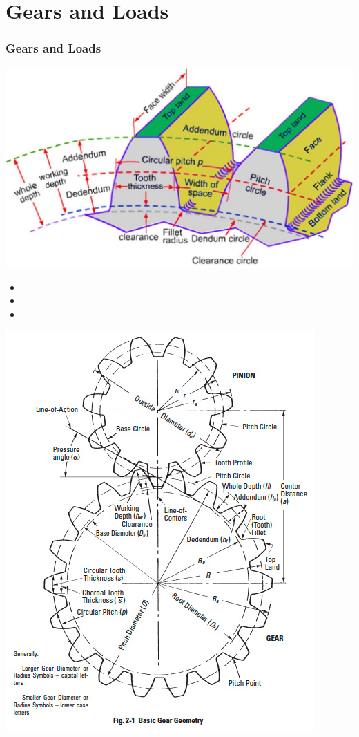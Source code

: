 \documentclass[fleqn]{beamer} %
\newcommand{\sectiontitleIII}{Gears and Loads}
\begin{document}
\section{\sectiontitleIII}	

	\begin{frame}[label=sectionIII] \small
		\frametitle{\sectiontitleIII}
	 		
			\begin{multicols}{2}
	 		\includegraphics[scale=0.20]{images/Gearnomenclature.png}
	        \begin{itemize}
	            \item 
	            \item 
	            \item 
	        \end{itemize}

	        \includegraphics[scale=0.3]{images/law_of_gearing.png}
	        \end{multicols}

	    
	        
		\end{frame}  
	
\end{document}
